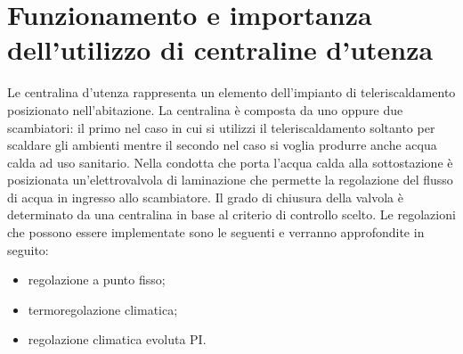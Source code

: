 \documentclass[laurea,oneside,11pt]{USiena_tesiLM}
\begin{document}
%

%


\section{Funzionamento e importanza dell'utilizzo di centraline d'utenza}

Le centralina d'utenza rappresenta un elemento dell'impianto di teleriscaldamento posizionato nell'abitazione. La centralina è composta da uno oppure due scambiatori: il primo nel caso in cui si utilizzi il teleriscaldamento soltanto per scaldare gli ambienti mentre il secondo nel caso si voglia produrre anche acqua calda ad uso sanitario. Nella condotta che porta l'acqua calda alla sottostazione è posizionata un'elettrovalvola di laminazione  che permette la regolazione del flusso di acqua in ingresso allo scambiatore. Il grado di chiusura della valvola è determinato da una centralina in base al criterio di controllo scelto. Le regolazioni che possono essere implementate sono le seguenti e verranno approfondite in seguito:

\begin{itemize}
\item regolazione a punto fisso;
\item termoregolazione climatica;
\item regolazione climatica evoluta PI.
\end{itemize}  
\end{document}
